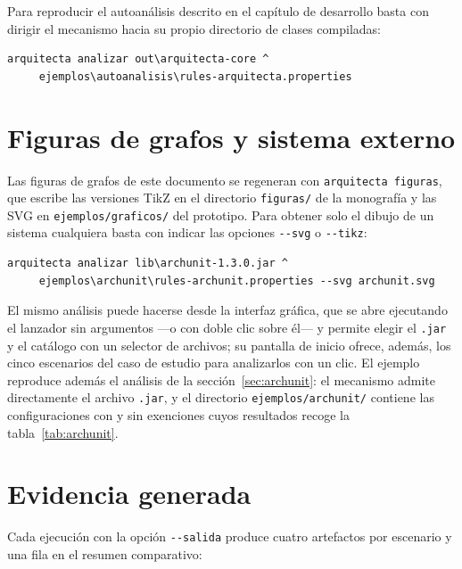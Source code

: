 Para reproducir el autoanálisis descrito en el capítulo de desarrollo basta con dirigir el mecanismo hacia su propio directorio de clases compiladas:

\begin{verbatim}
arquitecta analizar out\arquitecta-core ^
     ejemplos\autoanalisis\rules-arquitecta.properties
\end{verbatim}

\section{Figuras de grafos y sistema externo}
Las figuras de grafos de este documento se regeneran con \texttt{arquitecta figuras}, que escribe las versiones TikZ en el directorio \texttt{figuras/} de la monografía y las SVG en \texttt{ejemplos/graficos/} del prototipo. Para obtener solo el dibujo de un sistema cualquiera basta con indicar las opciones \texttt{-{}-svg} o \texttt{-{}-tikz}:

\begin{verbatim}
arquitecta analizar lib\archunit-1.3.0.jar ^
     ejemplos\archunit\rules-archunit.properties --svg archunit.svg
\end{verbatim}

\noindent El mismo análisis puede hacerse desde la interfaz gráfica, que se abre ejecutando el lanzador sin argumentos ---o con doble clic sobre él--- y permite elegir el \texttt{.jar} y el catálogo con un selector de archivos; su pantalla de inicio ofrece, además, los cinco escenarios del caso de estudio para analizarlos con un clic. El ejemplo reproduce además el análisis de la sección~\ref{sec:archunit}: el mecanismo admite directamente el archivo \texttt{.jar}, y el directorio \texttt{ejemplos/archunit/} contiene las configuraciones con y sin exenciones cuyos resultados recoge la tabla~\ref{tab:archunit}.

\section{Evidencia generada}
Cada ejecución con la opción \texttt{-{}-salida} produce cuatro artefactos por escenario y una fila en el resumen comparativo:


